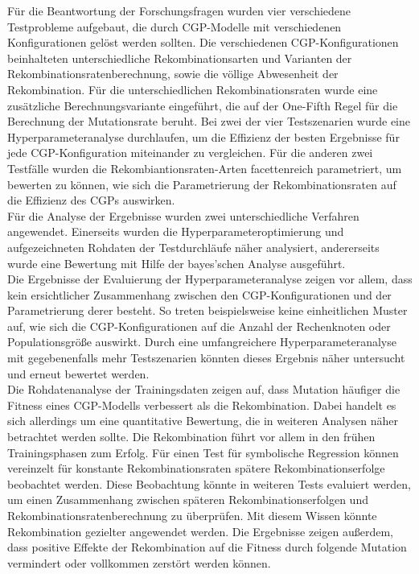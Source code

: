 Für die Beantwortung der Forschungsfragen wurden vier verschiedene Testprobleme aufgebaut, die durch CGP-Modelle mit verschiedenen Konfigurationen gelöst werden sollten.
Die verschiedenen CGP-Konfigurationen beinhalteten unterschiedliche Rekombinationsarten und Varianten der Rekombinationsratenberechnung, sowie die völlige Abwesenheit der Rekombination.
Für die unterschiedlichen Rekombinationsraten wurde eine zusätzliche Berechnungsvariante eingeführt, die auf der One-Fifth Regel für die Berechnung der Mutationsrate beruht.
Bei zwei der vier Testszenarien wurde eine Hyperparameteranalyse durchlaufen, um die Effizienz der besten Ergebnisse für jede CGP-Konfiguration miteinander zu vergleichen.
Für die anderen zwei Testfälle wurden die Rekombiantionsraten-Arten facettenreich parametriert, um bewerten zu können, wie sich die Parametrierung der Rekombinationsraten auf die Effizienz des CGPs auswirken.\\
Für die Analyse der Ergebnisse wurden zwei unterschiedliche Verfahren angewendet.
Einerseits wurden die Hyperparameteroptimierung und aufgezeichneten Rohdaten der Testdurchläufe näher analysiert, andererseits wurde eine Bewertung mit Hilfe der bayes'schen Analyse ausgeführt.\\
Die Ergebnisse der Evaluierung der Hyperparameteranalyse zeigen vor allem, dass kein ersichtlicher Zusammenhang zwischen den CGP-Konfigurationen und der Parametrierung derer besteht.
So treten beispielsweise keine einheitlichen Muster auf, wie sich die CGP-Konfigurationen auf die Anzahl der Rechenknoten oder Populationsgröße auswirkt.
Durch eine umfangreichere Hyperparameteranalyse mit gegebenenfalls mehr Testszenarien könnten dieses Ergebnis näher untersucht und erneut bewertet werden.\\
Die Rohdatenanalyse der Trainingsdaten zeigen auf, dass Mutation häufiger die Fitness eines CGP-Modells verbessert als die Rekombination.
Dabei handelt es sich allerdings um eine quantitative Bewertung, die in weiteren Analysen näher betrachtet werden sollte.
Die Rekombination führt vor allem in den frühen Trainingsphasen zum Erfolg.
Für einen Test für symbolische Regression können vereinzelt für konstante Rekombinationsraten spätere Rekombinationserfolge beobachtet werden.
Diese Beobachtung könnte in weiteren Tests evaluiert werden, um einen Zusammenhang zwischen späteren Rekombinationserfolgen und Rekombinationsratenberechnung zu überprüfen.
Mit diesem Wissen könnte Rekombination gezielter angewendet werden.
Die Ergebnisse zeigen außerdem, dass positive Effekte der Rekombination auf die Fitness durch folgende Mutation vermindert oder vollkommen zerstört werden können.

